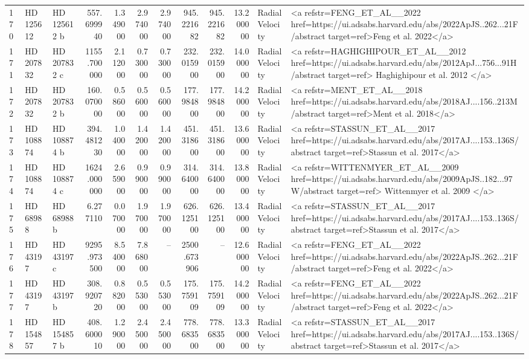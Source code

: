 \begin{tabular}{lllrrrrrrrll}
170 & HD 125612 & HD 125612 b & 557.699940 & 1.349000 & 2.974000 & 2.974000 & 945.221682 & 945.221682 & 13.200000 & Radial Velocity & <a refstr=FENG_ET_AL__2022 href=https://ui.adsabs.harvard.edu/abs/2022ApJS..262...21F/abstract target=ref>Feng et al. 2022</a> \\
171 & HD 207832 & HD 207832 c & 1155.700000 & 2.112000 & 0.730000 & 0.730000 & 232.015900 & 232.015900 & 14.000000 & Radial Velocity & <a refstr=HAGHIGHIPOUR_ET_AL__2012 href=https://ui.adsabs.harvard.edu/abs/2012ApJ...756...91H/abstract target=ref> Haghighipour et al. 2012 </a> \\
172 & HD 207832 & HD 207832 b & 160.070000 & 0.586000 & 0.560000 & 0.560000 & 177.984800 & 177.984800 & 14.200000 & Radial Velocity & <a refstr=MENT_ET_AL__2018 href=https://ui.adsabs.harvard.edu/abs/2018AJ....156..213M/abstract target=ref>Ment et al. 2018</a> \\
173 & HD 108874 & HD 108874 b & 394.481230 & 1.040000 & 1.420000 & 1.420000 & 451.318600 & 451.318600 & 13.600000 & Radial Velocity & <a refstr=STASSUN_ET_AL__2017 href=https://ui.adsabs.harvard.edu/abs/2017AJ....153..136S/abstract target=ref>Stassun et al. 2017</a> \\
174 & HD 108874 & HD 108874 c & 1624.000000 & 2.659000 & 0.990000 & 0.990000 & 314.640000 & 314.640000 & 13.800000 & Radial Velocity & <a refstr=WITTENMYER_ET_AL__2009 href=https://ui.adsabs.harvard.edu/abs/2009ApJS..182...97W/abstract target=ref> Wittenmyer et al. 2009 </a> \\
175 & HD 68988 & HD 68988 b & 6.277110 & 0.070000 & 1.970000 & 1.970000 & 626.125100 & 626.125100 & 13.400000 & Radial Velocity & <a refstr=STASSUN_ET_AL__2017 href=https://ui.adsabs.harvard.edu/abs/2017AJ....153..136S/abstract target=ref>Stassun et al. 2017</a> \\
176 & HD 43197 & HD 43197 c & 9295.973500 & 8.540000 & 7.868000 & -- & 2500.673906 & -- & 12.600000 & Radial Velocity & <a refstr=FENG_ET_AL__2022 href=https://ui.adsabs.harvard.edu/abs/2022ApJS..262...21F/abstract target=ref>Feng et al. 2022</a> \\
177 & HD 43197 & HD 43197 b & 308.920720 & 0.882000 & 0.553000 & 0.553000 & 175.759109 & 175.759109 & 14.200000 & Radial Velocity & <a refstr=FENG_ET_AL__2022 href=https://ui.adsabs.harvard.edu/abs/2022ApJS..262...21F/abstract target=ref>Feng et al. 2022</a> \\
178 & HD 154857 & HD 154857 b & 408.600010 & 1.290000 & 2.450000 & 2.450000 & 778.683500 & 778.683500 & 13.300000 & Radial Velocity & <a refstr=STASSUN_ET_AL__2017 href=https://ui.adsabs.harvard.edu/abs/2017AJ....153..136S/abstract target=ref>Stassun et al. 2017</a> \\

\end{tabular}
